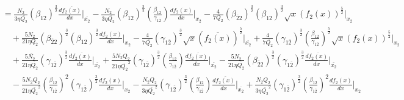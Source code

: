 \documentclass[fleqn, 10pt]{article}
\begin{document}
                \begin{equation*}
                \begin{split}
                    &=  \frac{N_2}{3 \eta \overline{Q_{2}}} (\beta_{12})^\frac{3}{2} \frac{d\overline{f_{2}(x)}}{dx} \Bigg|_{\overline{x_{2}}} -   \frac{N_2}{3 \eta \overline{Q_{2}}} (\beta_{12})^\frac{3}{2} \left( \frac{\beta_{12}}{\gamma_{1\overline{2}}}\right) \frac{df_2(x)}{dx} \Bigg|_{x_2} -   \frac{4}{7 Q_2} (\beta_{\overline{2}2})^\frac{3}{2} (\beta_{12})^\frac{3}{2} \sqrt{x} (f_2(x))^\frac{5}{2} \Bigg|_{x_2} \\ & \quad +   \frac{5 N_2}{21 \eta Q_2} (\beta_{\overline{2}2})^\frac{3}{2} (\beta_{12})^\frac{3}{2} \frac{df_2(x)}{dx} \Bigg|_{x_2}  -  \frac{4}{7 \overline{Q_{2}}} (\gamma_{1\overline{2}})^\frac{3}{2} \sqrt{x} (\overline{f_{2}(x)})^\frac{5}{2} \Bigg|_{\overline{x_{2}}} +   \frac{4}{7\overline{Q_{2}}} (\gamma_{1\overline{2}})^\frac{3}{2} \left( \frac{\beta_{12}}{\gamma_{1\overline{2}}}\right)^\frac{5}{2} \sqrt{x} (f_2(x))^\frac{5}{2} \Bigg|_{x_2} \\ & \quad +  \frac{5 \overline{N_{2}}}{21 \eta \overline{Q_{2}}} (\gamma_{1\overline{2}})^\frac{3}{2} \frac{d\overline{f_{2}(x)}}{dx} \Bigg|_{\overline{x_{2}}} +   \frac{5 N_2 Q_2}{21 \eta {\overline{Q_{2}}}^2} (\gamma_{1\overline{2}})^\frac{3}{2} \left( \frac{\beta_{12}}{\gamma_{1\overline{2}}}\right)\frac{d\overline{f_{2}(x)}}{dx} \Bigg|_{\overline{x_{2}}}  -  \frac{5 N_2}{21 \eta \overline{Q_{2}}} (\beta_{\overline{2}2})^\frac{3}{2} (\gamma_{1\overline{2}})^\frac{3}{2} \frac{d\overline{f_{2}(x)}}{dx} \Bigg|_{\overline{x_{2}}} \\ & \quad -   \frac{5 N_2 Q_2}{21 \eta {\overline{Q_{2}}}^2} \left( \frac{\beta_{12}}{\gamma_{1\overline{2}}}\right)^2 (\gamma_{1\overline{2}})^\frac{3}{2} \frac{df_2(x)}{dx} \Bigg|_{x_2} -   \frac{N_2 Q_2}{3 \eta {\overline{Q_{2}}}^2} (\gamma_{1\overline{2}})^\frac{3}{2} \left( \frac{\beta_{12}}{\gamma_{1\overline{2}}}\right)\frac{d\overline{f_{2}(x)}}{dx} \Bigg|_{\overline{x_{2}}}  +  \frac{N_2 Q_2}{3 \eta {\overline{Q_{2}}}^2} (\gamma_{1\overline{2}})^\frac{3}{2} \left( \frac{\beta_{12}}{\gamma_{1\overline{2}}}\right)^2 \frac{df_2(x)}{dx} \Bigg|_{x_2}
                    \end{split}
                \end{equation*}
\end{document}
